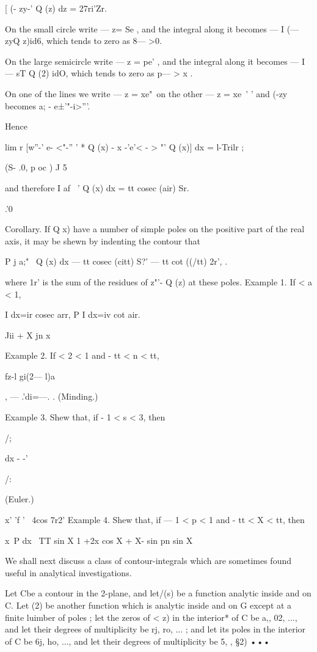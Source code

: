 [ (- zy-' Q (z) dz = 27ri'Zr.

On the small circle write — z= Se , and the integral along it becomes
— I (— zyQ z)id6, which tends to zero as 8— >0.

On the large semicircle write — z = pe' , and the integral along it
becomes — I — sT Q (2) idO, which tends to zero as p— > x .

On one of the lines we write — z = xe"\ on the other — z = xe~' ' and
(-zy~ becomes a; - e±'"-i>'''.

Hence

lim r [w''-' e- <"-'' ' * Q (x) - x -'e'< - > "' Q (x)] dx = l-Trilr ;

(S- .0, p oc ) J 5

and therefore I af ~' Q (x) dx = tt cosec (air) Sr.

.'0

Corollary. If Q x) have a number of simple poles on the positive part
of the real axis, it may be shewn by indenting the contour that

P j a;"~ Q (x) dx — tt cosec (citt) S?' — tt cot ((/tt) 2r', .

where 1r' is the sum of the residues of z"'- Q (z) at these poles.
Example 1. If < a < 1,

I dx=ir cosec arr, P I dx=iv cot air.

Jii + X jn x

%
%

Example 2. If < 2 < 1 and - tt < n < tt,

  

fz-l gi(2— l)a

, — .'di=—. . (Minding.)

Example 3. Shew that, if - 1 < s < 3, then

/;

  dx - -'

/:

(Euler.)

   x' 'f ' ~4cos 7r2' Example 4. Shew that, if — 1 < p < 1 and - tt <
X < tt, then

x~P dx \ TT sin X 1 +2x cos X + X- sin pn sin X

 We shall next discuss a class of contour-integrals which are
sometimes found useful in analytical investigations.

Let Cbe a contour in the 2-plane, and let/(s) be a function analytic
inside and on C. Let (2) be another function which is analytic inside
and on G except at a finite luimber of poles ; let the zeros of < z)
in the interior* of C be a,, 02, ..., and let their degrees of
multiplicity be rj, ro, ... ; and let its poles in the interior of C
be 6j, ho, ..., and let their degrees of multiplicity be 5, , §2) •••

